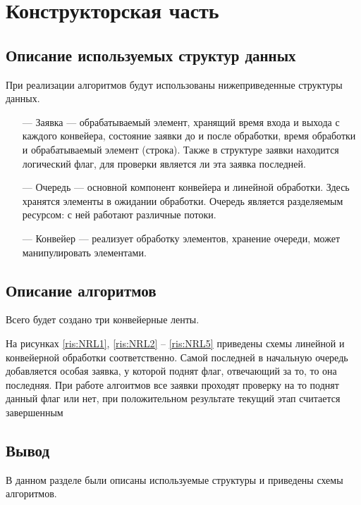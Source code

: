 \chapter{Конструкторская часть}

\section{Описание используемых структур данных}
При реализации алгоритмов будут использованы нижеприведенные структуры данных.
\begin{itemize}[itemindent=1.25em]
	\item[---] Заявка --- обрабатываемый элемент, хранящий время входа и выхода с каждого конвейера, состояние заявки до и после обработки, время обработки и обрабатываемый элемент (строка). Также в структуре заявки находится логический флаг, для проверки является ли эта заявка последней.
	\item[---] Очередь ---  основной компонент конвейера и линейной обработки. Здесь хранятся элементы в ожидании обработки. Очередь является разделяемым ресурсом: с ней работают различные потоки.
	\item[---] Конвейер ---  реализует обработку элементов, хранение очереди, может манипулировать элементами.
\end{itemize} 

\section{Описание алгоритмов}
Всего будет создано три конвейерные ленты.

На рисунках \ref{ris:NRL1}, \ref{ris:NRL2} -- \ref{ris:NRL5} приведены схемы линейной и конвейерной обработки соответственно. Самой последней в начальную очередь добавляется особая заявка, у которой поднят флаг, отвечающий за то, то она последняя. При работе алгоитмов все заявки проходят проверку на то поднят данный флаг или нет, при положительном результате текущий этап считается завершенным
\begin{center}	
	\centering
	\def\svgwidth{12cm}
	
	\label{ris:NRL1}
\end{center}
\begin{center}	
	\centering
	\def\svgwidth{5cm}
	
	\label{ris:NRL2}
\end{center}
\begin{center}	
	\newpage
	\centering
	\def\svgwidth{11cm}
	
	\label{ris:NRL3}
\end{center}
\begin{center}	
	\centering
	\def\svgwidth{11cm}
	
	\label{ris:NRL4}
\end{center}
\begin{center}	
	\centering
	\def\svgwidth{11cm}
	
	\label{ris:NRL5}
\end{center}

\section*{Вывод}
В данном разделе были описаны используемые структуры и приведены схемы алгоритмов.